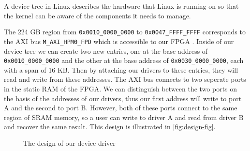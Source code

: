 \documentclass[psamsfonts]{amsart}
\theoremstyle{definition}
\theoremstyle{remark}
\numberwithin{equation}{section}
\begin{document}
A device tree in Linux describes the hardware that Linux is running on so that the kernel can be aware of the components it needs to manage.

The 224 GB region from \texttt{0x0010\_0000\_0000} to \texttt{0x0047\_FFFF\_FFFF} corresponds to the AXI bus \texttt{M\_AXI\_HPM0\_FPD} which is accessible to our FPGA \cite{zynq-doc}. Inside of our device tree we can create two new entries, one at the base address of \texttt{0x0010\_0000\_0000} and the other at the base address of \texttt{0x0030\_0000\_0000}, each with a span of 16 KB. Then by attaching our drivers to these entries, they will read and write from these addresses. The AXI bus connects to two seperate ports in the static RAM of the FPGA. We can distinguish between the two ports on the basis of the addresses of our drivers, thus our first address will write to port A and the second to port B. However, both of these ports connect to the same region of SRAM memory, so a user can write to driver A and read from driver B and recover the same result. This design is illustrated in \autoref{fig:design-fig}.


\begin{figure}[H]
  \centering

  \caption{The design of our device driver}
  \label{fig:design-fig}
\end{figure}
\end{document}
